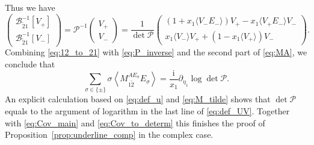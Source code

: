 \documentclass[10pt]{amsart}
\numberwithin{equation}{section}
\newcommand{\ii}{\mathrm{i}}
\begin{document}
Thus we have
\begin{equation}
\begin{pmatrix}
\mathcal{B}^{-1}_{\widetilde{2}1}[V_+]\\\mathcal{B}^{-1}_{\widetilde{2}1}[V_-]
\end{pmatrix}
=\mathcal{P}^{-1}\begin{pmatrix}
V_+\\V_-
\end{pmatrix}=\frac{1}{\det \mathcal{P}}
\begin{pmatrix}
\left(1+x_1\langle V_-E_-\rangle\right)V_+ - x_1\langle V_+E_-\rangle V_-\\
x_1\langle V_-\rangle V_+ +\left(1-x_1\langle V_+\rangle\right)V_-
\end{pmatrix}.
\label{eq:P_inverse}
\end{equation}
Combining \eqref{eq:12_to_21} with \eqref{eq:P_inverse} and the second part of \eqref{eq:MA}, we conclude that
\begin{equation}
\sum_{\sigma\in\{\pm\}} \sigma\left\langle M_{1\widetilde{2}}^{AE_\sigma}E_\sigma\right\rangle = \frac{\ii}{x_1}\partial_{\eta_1} \log \det \mathcal{P}.
\end{equation}
An explicit calculation based on \eqref{eq:def_u} and \eqref{eq:M_tilde} shows that $\det\mathcal{P}$ equals to the argument of logarithm in the last line of \eqref{eq:def_UV}. Together with \eqref{eq:Cov_main} and \eqref{eq:Cov_to_determ} this finishes the proof of Proposition~\ref{prop:underline_comp} in the complex case.


 
\end{document}
